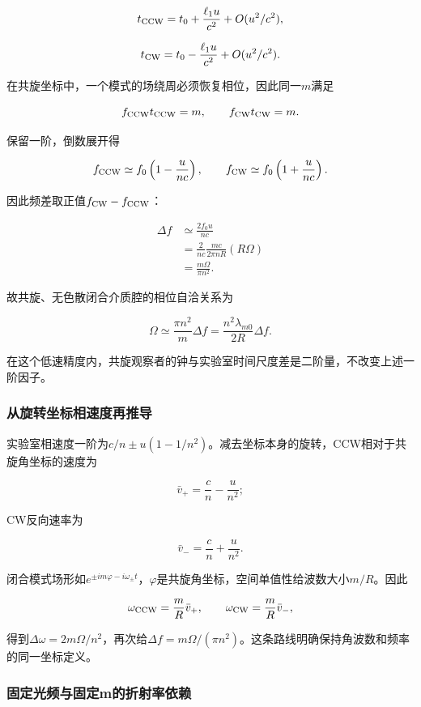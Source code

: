 \documentclass[12pt,a4paper,fontset=fandol]{ctexart}
\begin{document}
\[
t_{\rm CCW}=t_0+\frac{\ell_1u}{c^2}+O(u^2/c^2),
\]

\[
t_{\rm CW}=t_0-\frac{\ell_1u}{c^2}+O(u^2/c^2).
\]

在共旋坐标中，一个模式的场绕周必须恢复相位，因此同一\(m\)满足

\[
f_{\rm CCW}t_{\rm CCW}=m,\qquad
f_{\rm CW}t_{\rm CW}=m.
\]

保留一阶，倒数展开得

\[
f_{\rm CCW}
\simeq f_0\left(1-\frac{u}{nc}\right),
\qquad
f_{\rm CW}
\simeq f_0\left(1+\frac{u}{nc}\right).
\]

因此频差取正值\(f_{\rm CW}-f_{\rm CCW}\)：

\[
\begin{aligned}
\Delta f
&\simeq\frac{2f_0u}{nc}\\
&=\frac{2}{nc}\frac{mc}{2\pi nR}(R\Omega)\\
&=\boxed{\frac{m\Omega}{\pi n^2}}.
\end{aligned}
\]

故共旋、无色散闭合介质腔的相位自洽关系为

\[
\boxed{
\Omega\simeq\frac{\pi n^2}{m}\Delta f
=\frac{n^2\lambda_{m0}}{2R}\Delta f}.
\]

在这个低速精度内，共旋观察者的钟与实验室时间尺度差是二阶量，不改变上述一阶因子。

\subsubsection{从旋转坐标相速度再推导}\label{ux4eceux65cbux8f6cux5750ux6807ux76f8ux901fux5ea6ux518dux63a8ux5bfc}

实验室相速度一阶为\(c/n\pm u(1-1/n^2)\)。减去坐标本身的旋转，CCW相对于共旋角坐标的速度为

\[
\bar v_+=\frac cn-\frac{u}{n^2};
\]

CW反向速率为

\[
\bar v_-=\frac cn+\frac{u}{n^2}.
\]

闭合模式场形如\(e^{\pm im\varphi-i\omega_\pm t}\)，\(\varphi\)是共旋角坐标，空间单值性给波数大小\(m/R\)。因此

\[
\omega_{\rm CCW}=\frac mR\bar v_+,\qquad
\omega_{\rm CW}=\frac mR\bar v_-,
\]

得到\(\Delta\omega=2m\Omega/n^2\)，再次给\(\Delta f=m\Omega/(\pi n^2)\)。这条路线明确保持角波数和频率的同一坐标定义。

\subsubsection{固定光频与固定m的折射率依赖}\label{ux56faux5b9aux5149ux9891ux4e0eux56faux5b9amux7684ux6298ux5c04ux7387ux4f9dux8d56}
\end{document}
